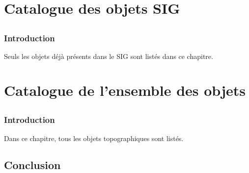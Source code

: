 \documentclass[12pt,titlepage]{book}
\begin{document}
\part{Catalogue des objets SIG}

\chapter*{}
\section*{Introduction}
Seuls les objets déjà présents dans le SIG sont listés dans ce chapitre.


\part{Catalogue de l'ensemble des objets}

\chapter*{}
\section*{Introduction}
Dans ce chapitre, tous les objets topographiques sont listés.




\backmatter

\chapter{Conclusion}



\listoffigures
\end{document}
